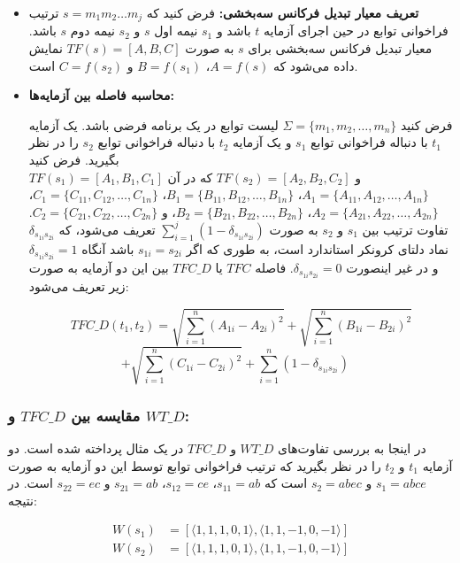 \begin{itemize}

\item \textbf{تعریف معیار تبدیل فرکانس سه‌بخشی:}
فرض کنید که \(s = m_1 m_2 \dots m_j\) ترتیب فراخوانی توابع در حین اجرای آزمایه \(t\) باشد و \(s_1\) نیمه اول \(s\) و \(s_2\) نیمه دوم \(s\) باشد. معیار تبدیل فرکانس سه‌بخشی برای \(s\) به صورت \(TF(s) = [A, B, C]\) نمایش داده می‌شود که \(A = f(s)\)، \(B = f(s_1)\) و \(C = f(s_2)\) است.

\item \textbf{محاسبه فاصله بین آزمایه‌‌ها:}

فرض کنید \(\Sigma = \{m_1, m_2, \dots, m_n\}\) لیست توابع در یک برنامه فرضی باشد. یک آزمایه \(t_1\) با دنباله فراخوانی توابع \(s_1\) و یک آزمایه \(t_2\) با دنباله فراخوانی توابع \(s_2\) را در نظر بگیرید. فرض کنید\\ \(TF(s_1) = [A_1, B_1, C_1]\) و \(TF(s_2) = [A_2, B_2, C_2]\) که در آن \(A_1 = \{A_{11}, A_{12}, \dots, A_{1n}\}\)، \(B_1 = \{B_{11}, B_{12}, \dots, B_{1n}\}\)، \(C_1 = \{C_{11}, C_{12}, \dots, C_{1n}\}\)، \(A_2 = \{A_{21}, A_{22}, \dots, A_{2n}\}\)، \(B_2 = \{B_{21}, B_{22}, \dots, B_{2n}\}\)، و \(C_2 = \{C_{21}, C_{22}, \dots, C_{2n}\}\). تفاوت ترتیب بین \(s_1\) و \(s_2\) به صورت \(\sum_{i=1}^{j} \left(1 - \delta_{s_{1i} s_{2i}}\right)\) تعریف می‌شود، که \(\delta_{s_{1i} s_{2i}}\) نماد دلتای کرونکر استاندارد است، به طوری که اگر \(s_{1i} = s_{2i}\) باشد آنگاه \(\delta_{s_{1i} s_{2i}} = 1\) و در غیر اینصورت \(\delta_{s_{1i} s_{2i}} = 0\). فاصله \(TFC\)  یا \(TFC\_D\) بین این دو آزمایه به صورت زیر تعریف می‌شود:

\[
TFC\_D(t_1, t_2) = \sqrt{\sum_{i=1}^{n} (A_{1i} - A_{2i})^2} + \sqrt{\sum_{i=1}^{n} (B_{1i} - B_{2i})^2}
\]
\[
+ \sqrt{\sum_{i=1}^{n} (C_{1i} - C_{2i})^2} + \sum_{i=1}^{n} \left(1 - \delta_{s_{1i} s_{2i}}\right)
\quad
\]

\end{itemize}

\subsubsection{مقایسه بین \(TFC\_D\) و \(WT\_D\):}
در اینجا به بررسی تفاوت‌های \(WT\_D\) و \(TFC\_D\) در یک مثال پرداخته شده است. دو آزمایه \(t_1\) و \(t_2\) را در نظر بگیرید که ترتیب فراخوانی توابع توسط این دو آزمایه به صورت \(s_1 = abce\) و \(s_2 = abec\) است که \(s_{11} = ab\)، \(s_{12} = ce\)، \(s_{21} = ab\) و \(s_{22} = ec\) است. در نتیجه:

\begin{align*}
	W(s_1) &= \left[\langle 1, 1, 1, 0, 1 \rangle, \langle 1, 1, -1, 0, -1 \rangle \right] \\
	W(s_2) &= \left[\langle 1, 1, 1, 0, 1 \rangle, \langle 1, 1, -1, 0, -1 \rangle \right]
\end{align*}

